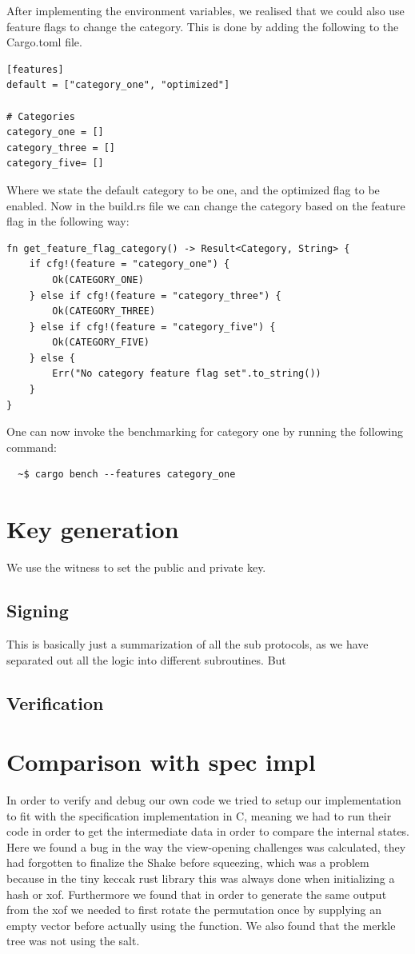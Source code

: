 \documentclass[11pt]{report}
\theoremstyle{definition}
\theoremstyle{plain}
\begin{document}
After implementing the environment variables, we realised that we could also use feature flags to change the category. This is done by adding the following to the Cargo.toml file.
\begin{verbatim}
[features]
default = ["category_one", "optimized"]

# Categories
category_one = []
category_three = []
category_five= []
\end{verbatim}
Where we state the default category to be one, and the optimized flag to be enabled.
Now in the build.rs file we can change the category based on the feature flag in the following way:
\begin{verbatim}
fn get_feature_flag_category() -> Result<Category, String> {
    if cfg!(feature = "category_one") {
        Ok(CATEGORY_ONE)
    } else if cfg!(feature = "category_three") {
        Ok(CATEGORY_THREE)
    } else if cfg!(feature = "category_five") {
        Ok(CATEGORY_FIVE)
    } else {
        Err("No category feature flag set".to_string())
    }
}
\end{verbatim}
One can now invoke the benchmarking for category one by running the following command:
\begin{verbatim}
  ~$ cargo bench --features category_one
\end{verbatim}


\section{Key generation}
We use the witness to set the public and private key.


\subsection{Signing}\label{sub:signing}
This is basically just a summarization of all the sub protocols, as we have separated out all the logic into different subroutines. But

\subsection{Verification}\label{sub:verification}



\section{Comparison with spec impl}\label{sub:comparison_with_spec_impl}
In order to verify and debug our own code we tried to setup our implementation to fit with the specification implementation in C, meaning we had to run their code in order to get the intermediate data in order to compare the internal states.
Here we found a bug in the way the view-opening challenges was calculated, they had forgotten to finalize the Shake before squeezing, which was a problem because in the tiny keccak rust library this was always done when initializing a hash or xof.
Furthermore we found that in order to generate the same output from the xof we needed to first rotate the permutation once by supplying an empty vector before actually using the function.
We also found that the merkle tree was not using the salt.
\end{document}
